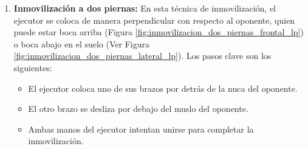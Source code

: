 \begin{enumerate}
	\item \textbf{Inmovilización a dos piernas:} En esta técnica de inmovilización, el ejecutor se coloca de manera perpendicular con respecto al oponente, quien puede estar boca arriba (Figura \ref{fig:inmovilizacion_dos_piernas_frontal_lp}) o boca abajo en el suelo (Ver Figura \ref{fig:inmovilizacion_dos_piernas_lateral_lp}). Los pasos clave son los siguientes:

	\begin{itemize}
		\item El ejecutor coloca uno de sus brazos por detrás de la nuca del oponente.
		\item El otro brazo se desliza por debajo del muslo del oponente.
		\item Ambas manos del ejecutor intentan unirse para completar la inmovilización.
	\end{itemize}



\end{enumerate}
